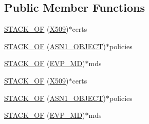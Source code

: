 \subsection*{Public Member Functions}
\begin{DoxyCompactItemize}
\item 
\hyperlink{struct_t_s__resp__ctx_a51f0ddafb33cce3c0ce72817d32f1baa}{S\+T\+A\+C\+K\+\_\+\+OF} (\hyperlink{crypto_2ossl__typ_8h_a4f666bde6518f95deb3050c54b408416}{X509})$\ast$certs
\item 
\hyperlink{struct_t_s__resp__ctx_a9320445919638a3fcc8652356d90dcf7}{S\+T\+A\+C\+K\+\_\+\+OF} (\hyperlink{crypto_2ossl__typ_8h_ae3fda0801e4c8e250087052bafb3ce2e}{A\+S\+N1\+\_\+\+O\+B\+J\+E\+CT})$\ast$policies
\item 
\hyperlink{struct_t_s__resp__ctx_a2909b1fcb6d38ab81f7525a1557a55ec}{S\+T\+A\+C\+K\+\_\+\+OF} (\hyperlink{crypto_2ossl__typ_8h_aac66cf010326fa9a927c2a34888f45d3}{E\+V\+P\+\_\+\+MD})$\ast$mds
\item 
\hyperlink{struct_t_s__resp__ctx_a51f0ddafb33cce3c0ce72817d32f1baa}{S\+T\+A\+C\+K\+\_\+\+OF} (\hyperlink{crypto_2ossl__typ_8h_a4f666bde6518f95deb3050c54b408416}{X509})$\ast$certs
\item 
\hyperlink{struct_t_s__resp__ctx_a9320445919638a3fcc8652356d90dcf7}{S\+T\+A\+C\+K\+\_\+\+OF} (\hyperlink{crypto_2ossl__typ_8h_ae3fda0801e4c8e250087052bafb3ce2e}{A\+S\+N1\+\_\+\+O\+B\+J\+E\+CT})$\ast$policies
\item 
\hyperlink{struct_t_s__resp__ctx_a2909b1fcb6d38ab81f7525a1557a55ec}{S\+T\+A\+C\+K\+\_\+\+OF} (\hyperlink{crypto_2ossl__typ_8h_aac66cf010326fa9a927c2a34888f45d3}{E\+V\+P\+\_\+\+MD})$\ast$mds
\end{DoxyCompactItemize}
